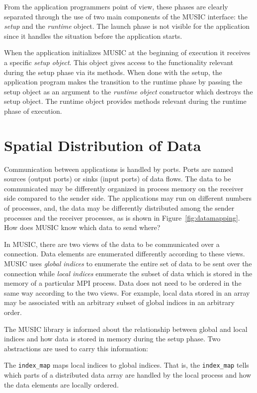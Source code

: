\documentclass[a4paper,twoside]{report}
\begin{document}
From the application programmers point of view, these phases are
clearly separated through the use of two main components of the
MUSIC interface: the \emph{setup} and the \emph{runtime} object.  The
launch phase is not visible for the application since it handles the
situation before the application starts.

When the application initializes MUSIC at the beginning of execution
it receives a specific \emph{setup object}.  This object gives access
to the functionality relevant during the setup phase via its methods.
When done with the setup, the application program makes the transition
to the runtime phase by passing the setup object as an argument to the
\emph{runtime object} constructor which destroys the setup object.
The runtime object provides methods relevant during the runtime phase
of execution.

\section{Spatial Distribution of Data}
\label{sec:spatialdist}

Communication between applications is handled by ports.  Ports are
named sources (output ports) or sinks (input ports) of data flows.
The data to be communicated may be differently organized in process
memory on the receiver side compared to the sender side.  The
applications may run on different numbers of processes, and, the data
may be differently distributed among the sender processes and the
receiver processes, as is shown in Figure~\ref{fig:datamapping}.  How
does MUSIC know which data to send where?

In MUSIC, there are two views of the data to be communicated over a
connection.  Data elements are enumerated differently according to
these views.  MUSIC uses \emph{global indices} to
enumerate the entire set of data to be sent over the connection while
\emph{local indices} enumerate the subset of data
which is stored in the memory of a particular MPI process.  Data does
not need to be ordered in the same way according to the two views.
For example, local data stored in an array may be associated with an
arbitrary subset of global indices in an arbitrary order.

The MUSIC library is informed about the relationship between global
and local indices and how data is stored in memory during the setup
phase.  Two abstractions are used to carry this information:

The \lstinline|index_map| maps local indices to global indices.  That
is, the \lstinline|index_map| tells which parts of a distributed data
array are handled by the local process and how the data elements are
locally ordered.
\end{document}
